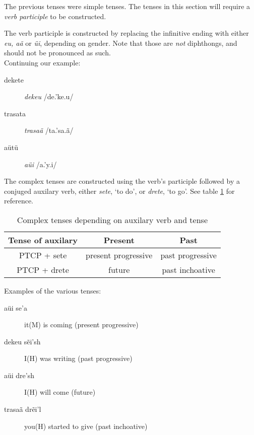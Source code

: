 The previous tenses were simple tenses. The tenses in this section will require a \emph{verb participle} to be constructed.

The verb participle is constructed by replacing the infinitive ending with either \emph{eu, aã} or \emph{üi}, depending on gender. Note that those are \emph{not} diphthongs, and should not be pronounced as such.\\

Continuing our example:
\begin{description}
\item[dekete] \emph{dekeu} /de.'ke.u/
\item[trasata] \emph{trasaã} /t{\ipaR}a.'sa.ã/
\item[aütü] \emph{aüi} /a.'y.i/
\end{description}

The complex tenses are constructed using the verb’s participle followed by a conjuged auxilary verb, either \emph{sete}, ‘to do’, or \emph{drete}, ‘to go’.
See table \ref{tab:conj-complex-tenses} for reference.

\begin{table}[h]
\begin{center}
\begin{tabular}{|c|c|c|}\hline

\textbf{Tense of auxilary} & \textbf{Present} & \textbf{Past} \\\hline
PTCP + sete & present progressive & past progressive \\\hline
PTCP + drete & future & past inchoative \\\hline

\end{tabular}
\end{center}
\caption{Complex tenses depending on auxilary verb and tense}
\label{tab:conj-complex-tenses}
\end{table}

Examples of the various tenses:
\begin{description}
\item[aüi se’a] it(M) is coming (present progressive)
\item[dekeu sẽi’sh] I(H) was writing (past progressive)
\item[aüi dre’sh] I(H) will come (future)
\item[trasaã drẽi’l] you(H) started to give (past inchoative)
\end{description}

